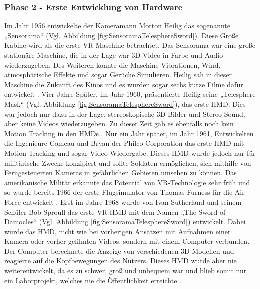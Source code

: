 \subsubsection{Phase 2 - Erste Entwicklung von Hardware}
Im Jahr 1956 entwickelte der Kameramann Morton Heilig das sogenannte „Sensorama“ (Vgl. Abbildung \ref{fig:SensoramaTelesphereSword}). Diese Große Kabine wird als die erste VR-Maschine betrachtet. Das Sensorama war eine große stationäre Maschine, die in der Lage war 3D Video in Farbe und Audio wiederzugeben. Des Weiteren konnte die Maschine Vibrationen, Wind, atmosphärische Effekte und sogar Gerüche Simulieren. Heilig sah in dieser Maschine die Zukunft des Kinos und es wurden sogar sechs kurze Filme dafür entwickelt \cite{20}.
\newline
Vier Jahre Später, im Jahr 1960, präsentierte Heilig seine „Telesphere Mask“ (Vgl. Abbildung \ref{fig:SensoramaTelesphereSword}), das erste HMD. Dies war jedoch nur dazu in der Lage, stereoskopische 3D-Bilder und Stereo Sound, aber keine Videos wiederzugeben. Zu dieser Zeit gab es ebenfalls noch kein Motion Tracking in den HMDs \cite{20}.
\newline
Nur ein Jahr später, im Jahr 1961, Entwickelten die Ingenieure Comeau und Bryan der Philco Corporation das erste HMD mit Motion Tracking und sogar Video Wiedergabe. Dieses HMD wurde jedoch nur für militärische Zwecke konzipiert und sollte Soldaten ermöglichen, sich mithilfe von Ferngesteuerten Kameras in gefährlichen Gebieten umsehen zu können. Das amerikanische Militär erkannte das Potential von VR-Technologie sehr früh und so wurde bereits 1966 der erste Flugsimulator von Thomas Furness für die Air Force entwickelt \cite{20}.
\newline
Erst im Jahre 1968 wurde von Ivan Sutherland und seinem Schüler Bob Sproull das erste VR-HMD mit dem Namen „The Sword of Damocles“ (Vgl. Abbildung \ref{fig:SensoramaTelesphereSword}) entwickelt. Dabei wurde das HMD, nicht wie bei vorherigen Ansätzen mit Aufnahmen einer Kamera oder vorher gefilmten Videos, sondern mit einem Computer verbunden. Der Computer berechnete die Anzeige von verschiedenen 3D Modellen und reagierte auf die Kopfbewegungen des Nutzers. Dieses HMD wurde aber nie weiterentwickelt, da es zu schwer, groß und unbequem war und blieb somit nur ein Laborprojekt, welches nie die Öffentlichkeit erreichte \cite{20}.
